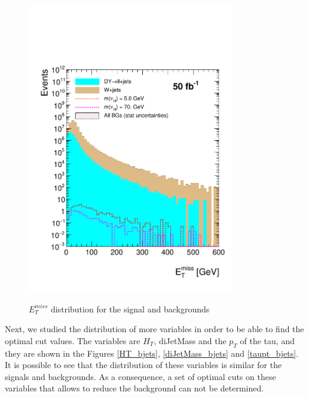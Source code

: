  \begin{figure}[h] 
 \centering
 \caption{$E_T^{miss}$ distribution for the signal and backgrounds}
 \includegraphics[width=0.8\textwidth]{./Capitulos/Analysis/AfterBJets/MET_MET_20} 
 \label{MET_bjets}
 \end{figure}
 
Next, we studied the distribution of more variables in order to be able to find the optimal cut values. The variables are $H_T$, diJetMass and the $p_T$ of the tau, and they are shown in the 
Figures \ref{HT_bjets}, \ref{diJetMass_bjets} and \ref{taupt_bjets}. It is possible to see that the distribution of these variables is similar for the signals and backgrounds. As a consequence, 
a set of optimal cuts on these variables that allows to reduce the background can not be determined.
 
